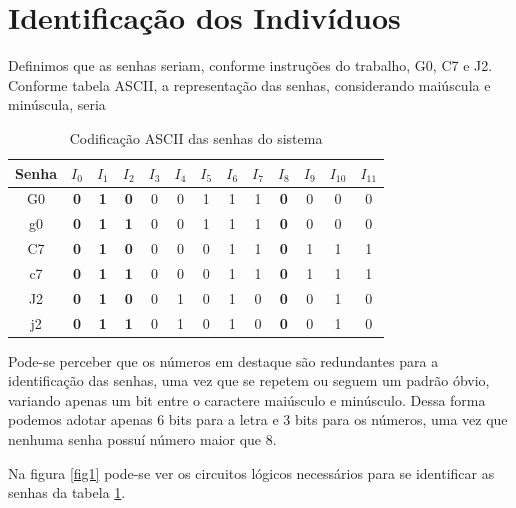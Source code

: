 \documentclass[12pt,a4paper]{article}
\begin{document}
\section{Identificação dos Indivíduos}

Definimos que as senhas seriam, conforme instruções do trabalho, G0, C7 e J2. Conforme tabela ASCII, a representação das senhas, considerando maiúscula e minúscula, seria

\bigskip

\begin{table}[hb]
\begin{center}
\begin{tabular}{c||cccccccc|cccc}
Senha & $I_0$ & $I_1$ & $I_2$ & $I_3$ & $I_4$ & $I_5$ & $I_6$ & $I_7$ & $I_8$ & $I_9$ & $I_{10}$ & $I_{11}$ \\
\hline
G0 & {\bf 0} & {\bf 1} & {\bf 0} & 0 & 0 & 1 & 1 & 1 & {\bf 0} & 0 & 0 & 0 \\
g0 & {\bf 0} & {\bf 1} & {\bf 1} & 0 & 0 & 1 & 1 & 1 & {\bf 0} & 0 & 0 & 0 \\
\hline
\hline
C7 & {\bf 0} & {\bf 1} & {\bf 0} & 0 & 0 & 0 & 1 & 1 & {\bf 0} & 1 & 1 & 1 \\
c7 & {\bf 0} & {\bf 1} & {\bf 1} & 0 & 0 & 0 & 1 & 1 & {\bf 0} & 1 & 1 & 1 \\
\hline
\hline
J2 & {\bf 0} & {\bf 1} & {\bf 0} & 0 & 1 & 0 & 1 & 0 & {\bf 0} & 0 & 1 & 0 \\
j2 & {\bf 0} & {\bf 1} & {\bf 1} & 0 & 1 & 0 & 1 & 0 & {\bf 0} & 0 & 1 & 0 \\
\end{tabular}
\end{center}
\caption{Codificação ASCII das senhas do sistema}
\label{tab1}
\end{table}

Pode-se perceber que os números em destaque são redundantes para a identificação das senhas, uma vez que se repetem ou seguem um padrão óbvio, variando apenas um bit entre o caractere maiúsculo e minúsculo. Dessa forma podemos adotar apenas 6 bits para a letra e 3 bits para os números, uma vez que nenhuma senha possuí número maior que 8.

Na figura \ref{fig1} pode-se ver os circuitos lógicos necessários para se identificar as senhas da tabela \ref{tab1}.
\end{document}
